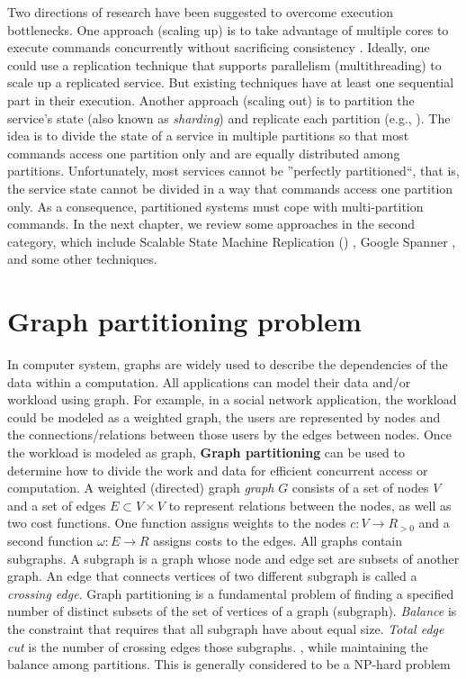 Two directions of research have been suggested to overcome execution
bottlenecks. One approach (scaling up) is to take advantage of multiple cores to
execute commands concurrently without sacrificing consistency
\cite{Kapritsos:2012um,Marandi:2014bj,Kotla:2004ep,guo2014rex}. Ideally, one
could use a replication technique that supports parallelism (multithreading) to
scale up a replicated service. But existing techniques have at least one
sequential part in their execution. Another approach (scaling out) is to
partition the service's state (also known as \emph{sharding}) and replicate each
partition (e.g., \cite{Glendenning:2011kj,Marandi:2011dj}). The idea is to
divide the state of a service in multiple partitions so that most commands
access one partition only and are equally distributed among partitions.
Unfortunately, most services cannot be ''perfectly partitioned``, that is, the
service state cannot be divided in a way that commands access one partition
only. As a consequence, partitioned systems must cope with multi-partition
commands. In the next chapter, we review some approaches in the second category,
which include Scalable State Machine Replication (\ssmr) \cite{bezerra2014ssmr},
Google Spanner \cite{corbett2013spanner}, and some other techniques.


\section{Graph partitioning problem}

In computer system, graphs are widely used to describe the dependencies of the
data within a computation. All applications can model their data and/or workload
using graph. For example, in a social network application, the workload could be
modeled as a weighted graph, the users are represented by nodes and the
connections/relations between those users by the edges between nodes. Once the
workload is modeled as graph, \textbf{Graph partitioning} can be used to
determine how to divide the work and data for efficient concurrent access or
computation.
A weighted (directed) graph \emph{graph} $G$ consists of a set of nodes $V$ and
a set of edges $E \subset V \times V$ to represent relations between the nodes,
as well as two cost functions. One function assigns weights to the nodes $c : V
\rightarrow R_{>0}$ and a second function $\omega : E \rightarrow R$ assigns
costs to the edges. All graphs contain subgraphs. A subgraph is a graph whose
node and edge set are subsets of another graph. An edge that connects vertices
of two different subgraph is called a \emph{crossing edge}. Graph partitioning
is a fundamental problem of finding a specified number of distinct subsets of
the set of vertices of a graph (subgraph). \emph{Balance} is the constraint that
requires that all subgraph have about equal size. \emph{Total edge cut} is the
number of crossing edges those subgraphs. , while maintaining
the balance among partitions. This is generally considered to be a NP-hard
problem \cite{karypis1998multilevelk}

